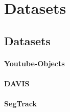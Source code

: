 \section{Datasets}

\subsection{Datasets}
\paragraph{Youtube-Objects~\cite{prest2012learning}} 

\paragraph{DAVIS~\cite{Perazzi2016,PontTuset2017,ponttuset2018}}

\paragraph{SegTrack~\cite{li2013video}}

